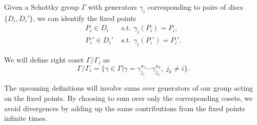 \begin{definition}
    Given a Schottky group $\Gamma$ with generators $\gamma_i$ corresponding to pairs of discs $\{D_i,D_i'\}$,
    we can identify the fixed points
    \begin{align}
        P_i \in D_i & \text{ s.t. } \gamma_i(P_i)=P_i, \\
        P_i' \in D_i' & \text{ s.t. } \gamma_i(P_i')=P_i'.
    \end{align}

    We will define right coset $\Gamma / \Gamma_i$ as
    \begin{equation}
        \Gamma / \Gamma_i = \{\gamma \in \Gamma | \gamma = \gamma_{j_1}^{n_1} \cdots \gamma_{j_k}^{n_k}, \ j_k \neq i\}.
    \end{equation}
\end{definition}

The upcoming definitions will involve sums over generators of our group acting on the fixed points.
By choosing to sum over only the corresponding cosets, we avoid divergences by adding up the same contributions from the fixed points infinite times.

